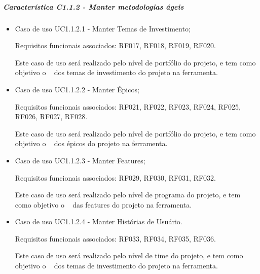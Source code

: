 	\subparagraph{Característica C1.1.2 - Manter metodologias ágeis}
		\begin{itemize}
			
			\item Caso de uso UC1.1.2.1 - Manter Temas de Investimento;
				
				Requisitos funcionais associados: RF017, RF018, RF019, RF020.

				Este caso de uso será realizado pelo nível de portfólio do projeto, e tem como objetivo o \CRUD~ dos temas de investimento do projeto na ferramenta.
			
			\item Caso de uso UC1.1.2.2 - Manter Épicos;
				
				Requisitos funcionais associados: RF021, RF022, RF023, RF024, RF025, RF026, RF027, RF028.

				Este caso de uso será realizado pelo nível de portfólio do projeto, e tem como objetivo o \CRUD~ dos épicos do projeto na ferramenta.
			
			\item Caso de uso UC1.1.2.3 - Manter Features;
				
				Requisitos funcionais associados: RF029, RF030, RF031, RF032.

				Este caso de uso será realizado pelo nível de programa do projeto, e tem como objetivo o \CRUD~ das features do projeto na ferramenta.
			
			\item Caso de uso UC1.1.2.4 - Manter Histórias de Usuário.
				
				Requisitos funcionais associados: RF033, RF034, RF035, RF036.

				Este caso de uso será realizado pelo nível de time do projeto, e tem como objetivo o \CRUD~ dos temas de investimento do projeto na ferramenta.
		\end{itemize}

